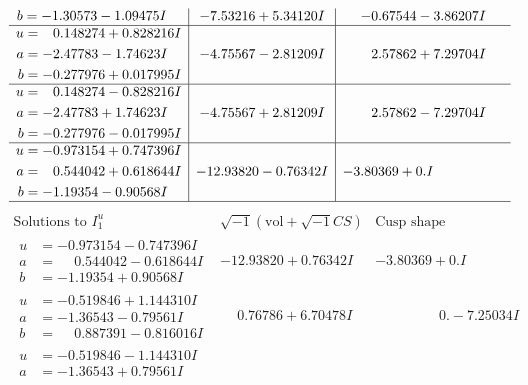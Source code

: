 \documentclass[1p]{elsarticle_modified}
\theoremstyle{definition}
\newcommand{\I}{\sqrt{-1}}
\begin{document}
$$\begin{array}{c|c|c}
\begin{aligned}
b &= -1.30573 - 1.09475 I\end{aligned}
 & -7.53216 + 5.34120 I & -0.67544 - 3.86207 I \\ \hline\begin{aligned}
u &= \phantom{-}0.148274 + 0.828216 I \\
a &= -2.47783 - 1.74623 I \\
b &= -0.277976 + 0.017995 I\end{aligned}
 & -4.75567 - 2.81209 I & \phantom{-}2.57862 + 7.29704 I \\ \hline\begin{aligned}
u &= \phantom{-}0.148274 - 0.828216 I \\
a &= -2.47783 + 1.74623 I \\
b &= -0.277976 - 0.017995 I\end{aligned}
 & -4.75567 + 2.81209 I & \phantom{-}2.57862 - 7.29704 I \\ \hline\begin{aligned}
u &= -0.973154 + 0.747396 I \\
a &= \phantom{-}0.544042 + 0.618644 I \\
b &= -1.19354 - 0.90568 I\end{aligned}
 & -12.93820 - 0.76342 I & -3.80369 + 0. I\phantom{ +0.000000I}\\
 \hline 
 \end{array}$$\newpage$$\begin{array}{c|c|c}  
\text{Solutions to }I^u_{1}& \I (\text{vol} + \sqrt{-1}CS) & \text{Cusp shape}\\
 \hline 
\begin{aligned}
u &= -0.973154 - 0.747396 I \\
a &= \phantom{-}0.544042 - 0.618644 I \\
b &= -1.19354 + 0.90568 I\end{aligned}
 & -12.93820 + 0.76342 I & -3.80369 + 0. I\phantom{ +0.000000I} \\ \hline\begin{aligned}
u &= -0.519846 + 1.144310 I \\
a &= -1.36543 - 0.79561 I \\
b &= \phantom{-}0.887391 - 0.816016 I\end{aligned}
 & \phantom{-}0.76786 + 6.70478 I & \phantom{-0.000000 } 0. - 7.25034 I \\ \hline\begin{aligned}
u &= -0.519846 - 1.144310 I \\
a &= -1.36543 + 0.79561 I \\

\end{aligned}
\end{array}$$
\end{document}
